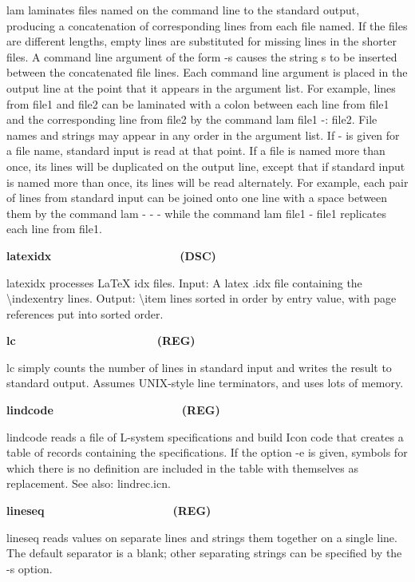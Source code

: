 \textsf{lam} laminates files named on the command line to the standard
output, producing a concatenation of corresponding lines from each file
named. If the files are different lengths, empty lines are substituted
for missing lines in the shorter files. A command line argument of the
form \textsf{{}-s} causes the string \textsf{s} to be inserted between
the concatenated file lines. Each command line argument is placed in
the output line at the point that it appears in the argument list. For
example, lines from file1 and file2 can be laminated with a colon
between each line from file1 and the corresponding line from file2 by
the command lam file1 -: file2. File names and strings may appear in
any order in the argument list. If - is given for a file name, standard
input is read at that point. If a file is named more than once, its
lines will be duplicated on the output line, except that if standard
input is named more than once, its lines will be read alternately. For
example, each pair of lines from standard input can be joined onto one
line with a space between them by the command lam - {\textquotedbl}-
{\textquotedbl} - while the command lam file1 {\textquotedbl}-
{\textquotedbl} file1 replicates each line from file1.

{\sffamily\bfseries
latexidx\ \ \ \ \ \ \ \ \ \ \ \ \ \ \ \ \ \ \ \ (DSC)}

\textsf{latexidx} processes LaTeX idx files. Input: A latex
.idx file containing the {\textbackslash}indexentry lines. Output:
{\textbackslash}item lines sorted in order by entry value, with page
references put into sorted order. 

{\sffamily\bfseries
lc\ \ \ \ \ \ \ \ \ \ \ \ \ \ \ \ \ \ \ \ \ \ (REG)}

\textsf{lc} simply counts the number of lines in standard input and
writes the result to standard output. Assumes UNIX-style line
terminators, and uses lots of memory. 

{\sffamily\bfseries
lindcode\ \ \ \ \ \ \ \ \ \ \ \ \ \ \ \ \ \ \ \ (REG)}

\textsf{lindcode} reads a file of L-system specifications and build Icon
code that creates a table of records containing the specifications. If
the option -e is given, symbols for which there is no definition are
included in the table with themselves as replacement. See also:
\textsf{lindrec.icn}.

{\sffamily\bfseries
lineseq\ \ \ \ \ \ \ \ \ \ \ \ \ \ \ \ \ \ \ \ (REG)}

\textsf{lineseq} reads values on separate lines and strings them
together on a single line. The default separator is a blank; other
separating strings can be specified by the \textsf{{}-s} option.

